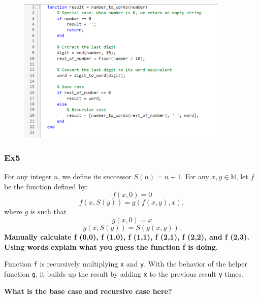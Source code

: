 \documentclass[
	11pt, %
]{beamer}
\begin{document}
\begin{frame}
   \begin{figure}
        \centering
        \includegraphics[width=0.9\textwidth]{ex4.png}
   \end{figure}
\end{frame}


\begin{frame}
    \frametitle{Ex5}
    For any integer \(n\), we define its successor \(S(n) = n + 1\). 
    For any \(x, y \in \mathbb{N}\), let \(f\) be the function defined by:
    \[
    f(x, 0) = 0
    \]
    \[
    f(x, S(y)) = g(f(x, y), x),
    \]
    where \(g\) is such that
    \[
    g(x, 0) = x
    \]
    \[
    g(x, S(y)) = S(g(x, y)).
    \]
    \textbf{Manually calculate f (0,0), f (1,0), f (1,1), f (2,1), f (2,2), and f (2,3).}
    \\
    \textbf{Using words explain what you guess the function f is doing.}
    
    \quad Function \texttt{f} is recursively multiplying \texttt{x} and \texttt{y}. 
    With the behavior of the helper function \texttt{g}, it builds up the result by adding \texttt{x} to the previous result \texttt{y} times.
   
    \textbf{What is the base case and recursive case here?}
\end{frame}

\end{document}
